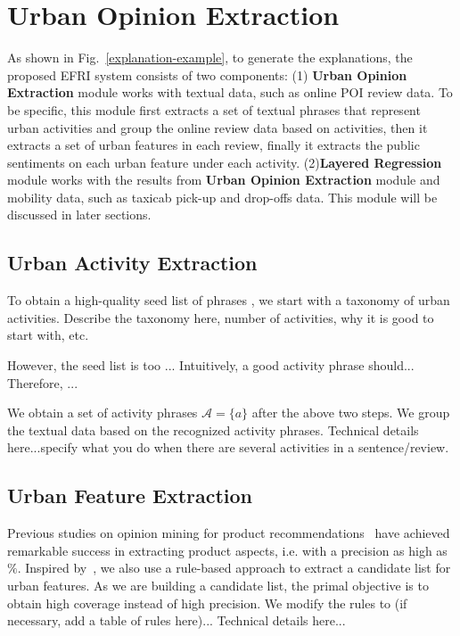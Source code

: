 \documentclass[runningheads]{llncs}
\begin{document}
\section{Urban Opinion Extraction}\label{sec:extraction}
As shown in Fig.~\ref{explanation-example}, to generate the explanations, the proposed EFRI system consists of two components: (1) \textbf{Urban Opinion Extraction} module works with textual data, such as online POI review data. To be specific, this module first extracts a set of textual phrases that represent urban activities and group the online review data based on activities, then it extracts a set of urban features in each review, finally it extracts the public sentiments on each urban feature under each activity. (2)\textbf{Layered Regression} module works with the results from \textbf{Urban Opinion Extraction} module and mobility data, such as taxicab pick-up and drop-offs data. This module will be discussed in later sections.

\subsection{Urban Activity Extraction}
To obtain a high-quality seed list of phrases , we start with a taxonomy of urban activities. Describe the taxonomy here, number of activities, why it is good to start with, etc.

However, the seed list is too ...
Intuitively, a good activity phrase should...
Therefore, ...

We obtain a set of activity phrases $\mathcal{A}=\{a\}$ after the above two steps.
We group the textual data based on the recognized activity phrases. 
Technical details here...specify what you do when there are several activities in a sentence/review. 

\subsection{Urban Feature Extraction}
Previous studies on opinion mining for product recommendations~\cite{} have achieved remarkable success in extracting product aspects, i.e. with a precision as high as $\%$.
Inspired by~\cite{}, we also use a rule-based approach to extract a candidate list for urban features.
As we are building a candidate list, the primal objective is to obtain high coverage instead of high precision. 
We modify the rules to (if necessary, add a table of rules here)...
Technical details here...
\end{document}
